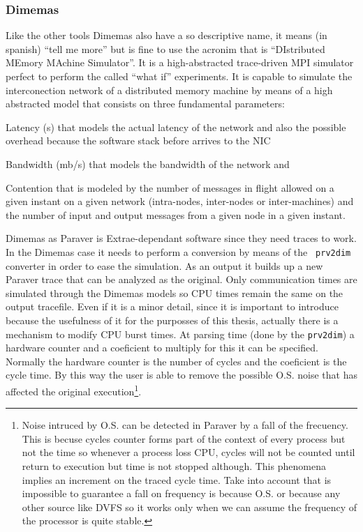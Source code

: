 \subsubsection{Dimemas}

Like the other tools Dimemas also have a so descriptive name, it means (in
spanish) ``tell me more'' but is fine to use the acronim that is ``DIstributed
MEmory MAchine Simulator''. It is a high-abstracted trace-driven MPI simulator
perfect to perform the called ``what if'' experiments. It is capable to simulate
the interconection network of a distributed memory machine by means of a high
abstracted model that consists on three fundamental parameters:
\begin{enumerate*}[label=\roman*)]
  \item Latency (s) that models the actual latency of the network and also the
    possible overhead because the software stack before arrives to the NIC
  \item Bandwidth (mb/s) that models the bandwidth of the network and
  \item Contention that is modeled by the number of messages in flight 
    allowed on a given instant on a given network (intra-nodes, inter-nodes or
    inter-machines) and the number of input and output messages from a given
    node in a given instant.
\end{enumerate*}

Dimemas as Paraver is Extrae-dependant software since they need traces to work.
In the Dimemas case it needs to perform a conversion by means of the {\tt
prv2dim} converter in order to ease the simulation. As an output it builds up a
new Paraver trace that can be analyzed as the original. Only communication times 
are simulated through the Dimemas models so CPU times
remain the same on the output tracefile. Even if it is a minor detail, since it
is important to introduce because the usefulness of it for the purposses of this
thesis, actually there is a mechanism to modify CPU burst times. At parsing time
(done by the {\tt prv2dim}) a hardware counter and a coeficient to multiply 
for this it can be specified. Normally the hardware counter is the number of 
cycles and the coeficient is the cycle time. By this way the user is able to 
remove the possible O.S. noise that has affected the original
execution\footnote{Noise intruced by O.S. can be detected in Paraver by a fall 
  of the frecuency. This is becuse cycles counter forms part of the context of
  every process but not the time so whenever a process loss CPU, cycles will not
  be counted until return to execution but time is not stopped although. This
  phenomena implies an increment on the traced cycle time. Take into account
  that is impossible to guarantee a fall on frequency is because O.S. or because
  any other source like DVFS so it works only when we can assume the frequency
of the processor is quite stable.}.

